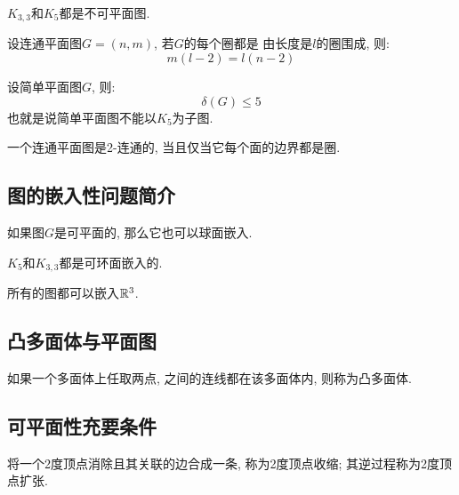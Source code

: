 \begin{theorem}[两种不可平面图]
    \(K_{3,3}\)和\(K_5\)都是不可平面图.
\end{theorem}

\begin{deduction}
    设连通平面图\(G=(n,m)\), 若\(G\)的每个圈都是
    由长度是\(l\)的圈围成, 则:
    \[m(l-2)=l(n-2)\]
\end{deduction}

\begin{deduction}
    设简单平面图\(G\), 则:
    \[\delta(G) \le 5\]
    也就是说简单平面图不能以\(K_5\)为子图.
\end{deduction}

\begin{theorem}
    一个连通平面图是2-连通的, 当且仅当它每个面的边界都是圈.
\end{theorem}

\subsection{图的嵌入性问题简介}

\begin{theorem}
    如果图\(G\)是可平面的, 那么它也可以球面嵌入.
\end{theorem}

\begin{theorem}
    \(K_5\)和\(K_{3,3}\)都是可环面嵌入的.
\end{theorem}

\begin{theorem}
    所有的图都可以嵌入\(\mathbb{R}^3\).
\end{theorem}

\subsection{凸多面体与平面图}

\begin{definition}[凸多面体]
    如果一个多面体上任取两点, 之间的连线都在该多面体内,
    则称为凸多面体.
\end{definition}

\subsection{可平面性充要条件}

\begin{definition}[2度顶点收缩/扩充]
    将一个2度顶点消除且其关联的边合成一条, 称为2度顶点收缩;
    其逆过程称为2度顶点扩张.
\end{definition}

